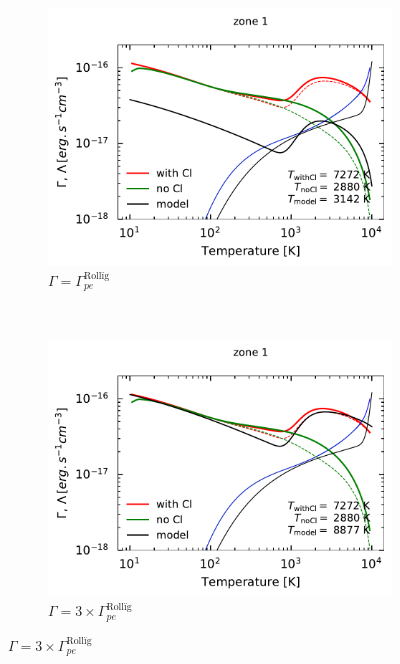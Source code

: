 \begin{figure}[!h]
    \centering
    \begin{subfigure}[t]{0.49\textwidth} %
        \centering \includegraphics[trim = {0 0 0 1cm },clip,width=1\textwidth]{figure/Cl/modelPE/GCcomp_Cl_1_1.pdf}
        \caption{$\Gamma =  \Gamma_{pe}^{\mathrm{Rollïg}}$}
    \label{fig:Cl:modelPE:GC}
    \end{subfigure}
    ~ 
    \begin{subfigure}[t]{0.49\textwidth}
        \centering \includegraphics[trim = {0 0 0 1cm },clip,width=1\textwidth]{figure/Cl/modelPE/GCcomp_Cl_1_3.pdf}
        \caption{$\Gamma =  3 \times \Gamma_{pe}^{\mathrm{Rollïg}}$}

\end{subfigure}
\end{figure}

